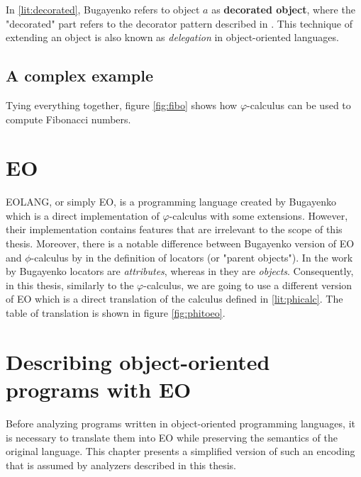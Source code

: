In \ref{lit:decorated}, Bugayenko \cite{eolang} refers to object $a$ as \textbf{decorated object}, where the "decorated" part refers to the decorator pattern described in \cite[Chapter 4]{GOFPatterns}. This technique of extending an object is also known as \textit{delegation} \cite{raiha_delegation:_1994} in object-oriented languages.

\subsection{A complex example}
Tying everything together, figure \ref{fig:fibo} shows how $\varphi$-calculus can be used to compute Fibonacci numbers.




\section{EO}
\label{lit:eo}
EOLANG, or simply EO, is a programming language created by Bugayenko \cite{eolang} which is a direct implementation of $\varphi$-calculus with some extensions. However, their implementation contains features that are irrelevant to the scope of this thesis. Moreover, there is a notable difference between Bugayenko version of EO and $\phi$-calculus by \cite{kudasov} in the definition of locators (or "parent objects"). In the work by Bugayenko locators are \textit{attributes}, whereas in \cite{kudasov} they are \textit{objects}. Consequently, in this thesis, similarly to the $\varphi$-calculus, we are going to use a different version of EO which is a direct translation of the calculus defined in \ref{lit:phicalc}. The table of translation is shown in figure \ref{fig:phitoeo}.



\section{Describing object-oriented programs with EO}
\label{lit:encoding}
Before analyzing programs written in object-oriented programming languages, it is necessary to translate them into EO while preserving the semantics of the original language. This chapter presents a simplified version of such an encoding that is assumed by analyzers described in this thesis.

